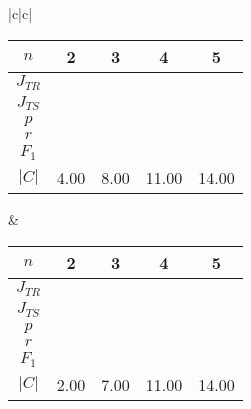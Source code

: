 \begin{table}[h]
{\begin{tabular}{|c|c|}
\begin{tabular}{c|cccc}
$n$ & 2 & 3 & 4 & 5 \\ \hline 
$J_{TR}$ & \cca{73}{0.73} & \cca{77}{0.77} & \cca{56}{0.57} & \cca{8}{0.08} \\ \hline 
$J_{TS}$ & \cca{82}{0.82} & \cca{74}{0.74} & \cca{42}{0.42} & \cca{3}{0.03} \\ \hline 
$p$ & \cca{88}{0.88} & \cca{80}{0.80} & \cca{59}{0.59} & \cca{6}{0.06} \\ \hline 
$r$ & \cca{93}{0.93} & \cca{91}{0.91} & \cca{61}{0.61} & \cca{32}{0.32} \\ \hline 
$F_1$ & \cca{90}{0.90} & \cca{85}{0.85} & \cca{59}{0.59} & \cca{5}{0.05} \\ \hline 
$|C|$ & 4.00 & 8.00 & 11.00 & 14.00 \\ \hline 
\end{tabular} 
& 
\begin{tabular}{c|cccc} 
$n$ & 2 & 3 & 4 & 5 \\ \hline 
$J_{TR}$ & \cca{79}{0.79} & \cca{81}{0.81} & \cca{81}{0.81} & \cca{14}{0.14} \\ \hline 
$J_{TS}$ & \cca{97}{0.97} & \cca{84}{0.84} & \cca{60}{0.60} & \cca{3}{0.03} \\ \hline 
$p$ & \cca{99}{0.99} & \cca{88}{0.88} & \cca{64}{0.64} & \cca{3}{0.03} \\ \hline 
$r$ & \cca{98}{0.98} & \cca{94}{0.94} & \cca{90}{0.90} & \cca{57}{0.58} \\ \hline 
$F_1$ & \cca{98}{0.98} & \cca{91}{0.91} & \cca{75}{0.75} & \cca{5}{0.05} \\ \hline 
$|C|$ & 2.00 & 7.00 & 11.00 & 14.00 \\ \hline 
\end{tabular} 
\end{tabular} 
} 
\end{table} 
